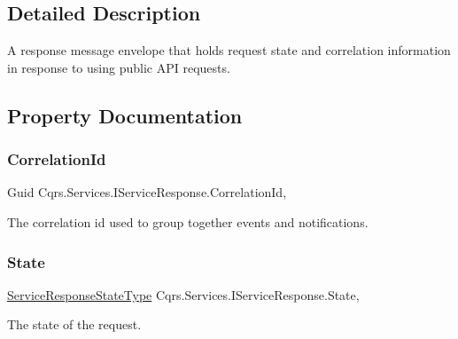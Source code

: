 \subsection{Detailed Description}
A response message envelope that holds request state and correlation information in response to using public A\+PI requests. 



\subsection{Property Documentation}
\mbox{\label{interfaceCqrs_1_1Services_1_1IServiceResponse_a5f6a02ee73059558e9859d7e5fe06025_a5f6a02ee73059558e9859d7e5fe06025}} 
\subsubsection{\texorpdfstring{Correlation\+Id}{CorrelationId}}
{\footnotesize\ttfamily Guid Cqrs.\+Services.\+I\+Service\+Response.\+Correlation\+Id\hspace{0.3cm}{\ttfamily [get]}, {\ttfamily [set]}}



The correlation id used to group together events and notifications. 

\mbox{\label{interfaceCqrs_1_1Services_1_1IServiceResponse_a946aa90e8fcd82481944c571baaebb2e_a946aa90e8fcd82481944c571baaebb2e}} 
\subsubsection{\texorpdfstring{State}{State}}
{\footnotesize\ttfamily \hyperlink{namespaceCqrs_1_1Services_a41411b784c4fcb7eed0cef2a5b522de0_a41411b784c4fcb7eed0cef2a5b522de0}{Service\+Response\+State\+Type} Cqrs.\+Services.\+I\+Service\+Response.\+State\hspace{0.3cm}{\ttfamily [get]}, {\ttfamily [set]}}



The state of the request. 

